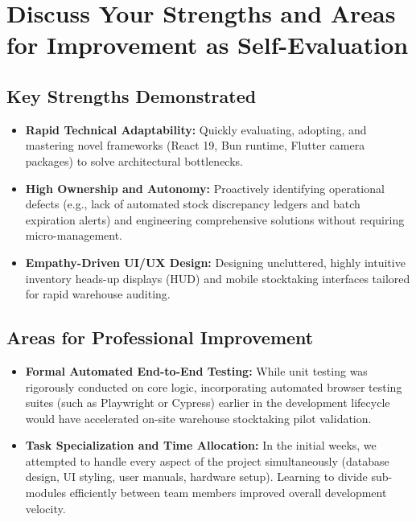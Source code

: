 \section{Discuss Your Strengths and Areas for Improvement as Self-Evaluation}

\subsection{Key Strengths Demonstrated}
\begin{itemize}
    \item \textbf{Rapid Technical Adaptability:} Quickly evaluating, adopting, and mastering novel frameworks (React 19, Bun runtime, Flutter camera packages) to solve architectural bottlenecks.
    \item \textbf{High Ownership and Autonomy:} Proactively identifying operational defects (e.g., lack of automated stock discrepancy ledgers and batch expiration alerts) and engineering comprehensive solutions without requiring micro-management.
    \item \textbf{Empathy-Driven UI/UX Design:} Designing uncluttered, highly intuitive inventory heads-up displays (HUD) and mobile stocktaking interfaces tailored for rapid warehouse auditing.
\end{itemize}

\subsection{Areas for Professional Improvement}
\begin{itemize}
    \item \textbf{Formal Automated End-to-End Testing:} While unit testing was rigorously conducted on core logic, incorporating automated browser testing suites (such as Playwright or Cypress) earlier in the development lifecycle would have accelerated on-site warehouse stocktaking pilot validation.
    \item \textbf{Task Specialization and Time Allocation:} In the initial weeks, we attempted to handle every aspect of the project simultaneously (database design, UI styling, user manuals, hardware setup). Learning to divide sub-modules efficiently between team members improved overall development velocity.
\end{itemize}
